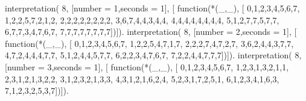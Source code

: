 interpretation( 8, [number = 1,seconds = 1], [
    function(*(_,_), [
        0,1,2,3,4,5,6,7,
        1,2,2,5,7,2,1,2,
        2,2,2,2,2,2,2,2,
        3,6,7,4,4,3,4,4,
        4,4,4,4,4,4,4,4,
        5,1,2,7,7,5,7,7,
        6,7,7,3,4,7,6,7,
        7,7,7,7,7,7,7,7])]).
interpretation( 8, [number = 2,seconds = 1], [
    function(*(_,_), [
        0,1,2,3,4,5,6,7,
        1,2,2,5,4,7,1,7,
        2,2,2,7,4,7,2,7,
        3,6,2,4,4,3,7,7,
        4,7,2,4,4,4,7,7,
        5,1,2,4,4,5,7,7,
        6,2,2,3,4,7,6,7,
        7,2,2,4,4,7,7,7])]).
interpretation( 8, [number = 3,seconds = 1], [
    function(*(_,_), [
        0,1,2,3,4,5,6,7,
        1,2,3,1,3,2,1,1,
        2,3,1,2,1,3,2,2,
        3,1,2,3,2,1,3,3,
        4,3,1,2,1,6,2,4,
        5,2,3,1,7,2,5,1,
        6,1,2,3,4,1,6,3,
        7,1,2,3,2,5,3,7])]).
